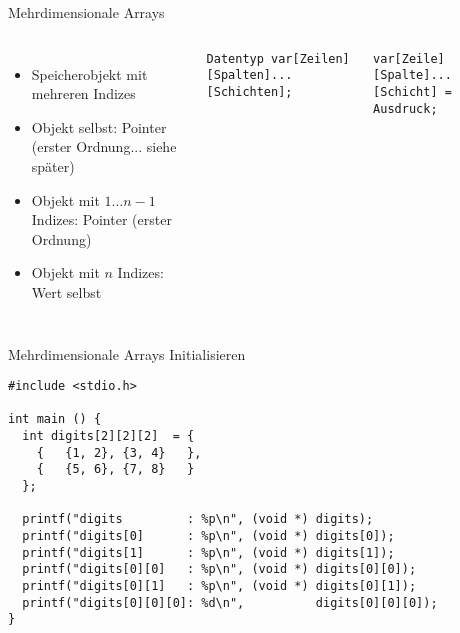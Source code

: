 \begin{frame}{Mehrdimensionale Arrays}
%
\begin{columns}[T]
\begin{itemize}
\item Speicherobjekt mit mehreren Indizes
\item Objekt selbst: Pointer (erster Ordnung... siehe später)
\item Objekt mit $1 \ldots n-1$ Indizes: Pointer (erster Ordnung)
\item Objekt mit $n$ Indizes: Wert selbst
\end{itemize}
%
\begin{codebox}
\texttt{\footnotesize Datentyp var[Zeilen][Spalten]...[Schichten];}
\end{codebox}
%
\begin{codebox}
\texttt{\footnotesize var[Zeile][Spalte]...[Schicht] = Ausdruck;}
\end{codebox}
%
\end{columns}
%
\vspace{6pt}
%

%
\end{frame}


\begin{frame}[fragile]{Mehrdimensionale Arrays Initialisieren}
%
\begin{codebox}
\begin{verbatim}
#include <stdio.h>

int main () {
  int digits[2][2][2]  = {
    {   {1, 2}, {3, 4}   }, 
    {   {5, 6}, {7, 8}   }
  };
  
  printf("digits         : %p\n", (void *) digits);
  printf("digits[0]      : %p\n", (void *) digits[0]);
  printf("digits[1]      : %p\n", (void *) digits[1]);
  printf("digits[0][0]   : %p\n", (void *) digits[0][0]);
  printf("digits[0][1]   : %p\n", (void *) digits[0][1]);
  printf("digits[0][0][0]: %d\n",          digits[0][0][0]);
}
\end{verbatim}
\end{codebox}
%
\end{frame}


